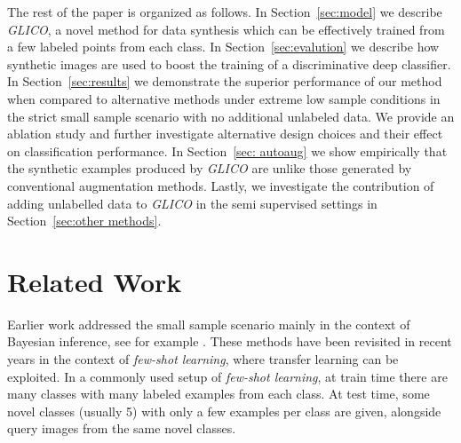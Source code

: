 \documentclass[a4paper,conference]{IEEEtran}
\begin{document}
The rest of the paper is organized as follows. In Section~\ref{sec:model} we describe \textit{GLICO}, a novel method for data synthesis which can be effectively trained from a few labeled points from each class. In Section~\ref{sec:evalution} we describe how synthetic images are used to boost the training of a discriminative deep classifier. In Section~\ref{sec:results} we demonstrate the superior performance of our method when compared to alternative methods under extreme low sample conditions in the strict small sample scenario with no additional unlabeled data. We provide an ablation study and further investigate alternative design choices and their effect on classification performance. 
In Section~\ref{sec: autoaug} we show empirically that the synthetic examples produced by \textit{GLICO} are unlike those generated by conventional augmentation methods. Lastly, we investigate the contribution of adding unlabelled data to \textit{GLICO} in the semi supervised settings in Section~\ref{sec:other methods}.







\section{Related Work}

Earlier work addressed the small sample scenario mainly in the context of Bayesian inference, see for example \cite{Baxter97abayesian, Thrun1998LearningTL, LiFergusPerona04}. These methods have been revisited in recent years in the context of \emph{few-shot learning}, where transfer learning can be exploited. In a commonly used setup of \emph{few-shot learning}, at train time there are many classes with many labeled examples from each class. At test time, some novel classes (usually 5) with only a few examples per class are given, alongside query images from the same novel classes. 
 
\end{document}
